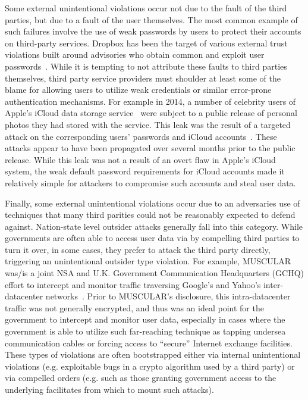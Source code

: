 Some external unintentional violations occur not due to the fault of
the third parties, but due to a fault of the user themselves. The most
common example of such failures involve the use of weak passwords by
users to protect their accounts on third-party services.  Dropbox has
been the target of various external trust violations built around
advisories who obtain common and exploit user
passwords~\cite{dropbox-passwords}. While it is tempting to not
attribute these faults to third parties themselves, third party
service providers must shoulder at least some of the blame for
allowing users to utilize weak credentials or similar error-prone
authentication mechanisms. For example in 2014, a number of celebrity
users of Apple's iCloud data storage service~\cite{apple-icloud} were
subject to a public release of personal photos they had stored with
the service. This leak was the result of a targeted attack on the
corresponding users' passwords and iCloud
accounts~\cite{apple-icloudleak}. These attacks appear to have been
propagated over several months prior to the public release. While this
leak was not a result of an overt flaw in Apple's iCloud system, the
weak default password requirements for iCloud accounts made it
relatively simple for attackers to compromise such accounts and steal
user data.

Finally, some external unintentional violations occur due to an
adversaries use of techniques that many third parities could not be
reasonably expected to defend against. Nation-state level outsider
attacks generally fall into this category. While governments are often
able to access user data via by compelling third parties to turn it
over, in some cases, they prefer to attack the third party directly,
triggering an unintentional outsider type violation. For example,
MUSCULAR was/is a joint NSA and U.K. Government Communication
Headquarters (GCHQ) effort to intercept and monitor traffic traversing
Google's and Yahoo's inter-datacenter
networks~\cite{gellman-muscular}. Prior to MUSCULAR's disclosure, this
intra-datacenter traffic was not generally encrypted, and thus was an
ideal point for the government to intercept and monitor user data,
especially in cases where the government is able to utilize such
far-reaching technique as tapping undersea communication cables or
forcing access to ``secure'' Internet exchange facilities. These types
of violations are often bootstrapped either via internal unintentional
violations (e.g. exploitable bugs in a crypto algorithm used by a
third party) or via compelled orders (e.g. such as those granting
government access to the underlying facilitates from which to mount
such attacks).

